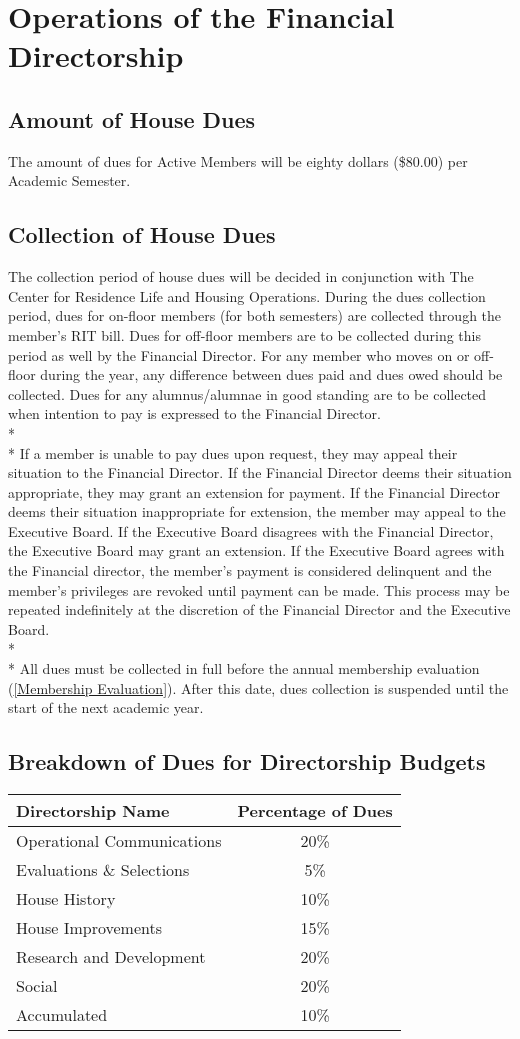 \documentclass{article}
\newcommand{\bylaw}[1]{\section{#1} \label{#1}}
\newcommand{\bsection}[1]{\subsection{#1} \label{#1}}
\begin{document}
\bylaw{Operations of the Financial Directorship}
\bsection{Amount of House Dues}
The amount of dues for Active Members will be eighty dollars (\$80.00) per Academic Semester.
\bsection{Collection of House Dues}
The collection period of house dues will be decided in conjunction with The Center for Residence Life and Housing Operations.
During the dues collection period, dues for on-floor members (for both semesters) are collected through the member’s RIT bill.
Dues for off-floor members are to be collected during this period as well by the Financial Director.
For any member who moves on or off-floor during the year, any difference between dues paid and dues owed should be collected.
Dues for any alumnus/alumnae in good standing are to be collected when intention to pay is expressed to the Financial Director.
\\*\\*
If a member is unable to pay dues upon request, they may appeal their situation to the Financial Director.
If the Financial Director deems their situation appropriate, they may grant an extension for payment.
If the Financial Director deems their situation inappropriate for extension, the member may appeal to the Executive Board.
If the Executive Board disagrees with the Financial Director, the Executive Board may grant an extension.
If the Executive Board agrees with the Financial director, the member’s payment is considered delinquent and the member’s privileges are revoked until payment can be made.
This process may be repeated indefinitely at the discretion of the Financial Director and the Executive Board.
\\*\\*
All dues must be collected in full before the annual membership evaluation (\ref{Membership Evaluation}).
After this date, dues collection is suspended until the start of the next academic year.
\bsection{Breakdown of Dues for Directorship Budgets}
\begin{center}
\begin{tabular}[c]{l c}
Directorship Name & Percentage of Dues \\
\hline
\hline
Operational Communications & 20\% \\
\hline
Evaluations \& Selections & 5\% \\
\hline
House History & 10\% \\
\hline
House Improvements & 15\% \\
\hline
Research and Development & 20\% \\
\hline
Social & 20\% \\
\hline
Accumulated & 10\% \\
\hline
\end{tabular}
\end{center}
\end{document}
